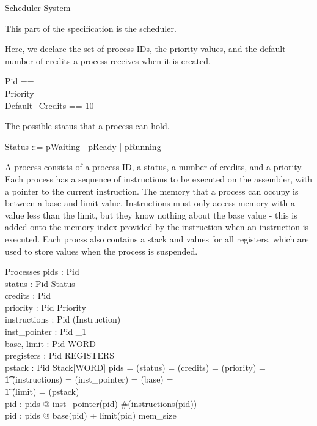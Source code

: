 \documentclass{article}
\begin{document}
\begin{zsection}
  \SECTION Scheduler \parents System
\end{zsection}

This part of the specification is the scheduler.

Here, we declare the set of process IDs, the priority values, and the
default number of credits a process receives when it is created.

\begin{zed}
  Pid == \nat\\
  Priority ==  \\
  Default\_Credits == 10 
\end{zed}

The possible status that a process can hold.

\begin{zed}
  Status ::= pWaiting | pReady | pRunning
\end{zed}

A process consists of a process ID, a status, a number of credits, and
a priority. Each process has a sequence of instructions to be executed
on the assembler, with a pointer to the current instruction. The
memory that a process can occupy is between a base and limit
value. Instructions must only access memory with a value less than the
limit, but they know nothing about the base value - this is added onto
the memory index provided by the instruction when an instruction is
executed. Each procss also contains a stack and values for all
registers, which are used to store values when the process is
suspended.

\begin{schema}{Processes}
  pids : \power Pid\\
  status : Pid \pfun Status\\
  credits : Pid \pfun \nat\\
  priority : Pid \pfun Priority\\
  instructions : Pid \pfun (\seq Instruction)\\
  inst\_pointer : Pid \pfun \nat_1\\    
  base, limit : Pid \pfun WORD\\
  pregisters : Pid \pfun REGISTERS\\
  pstack : Pid \pfun Stack[WORD]
\where
  pids = \dom(status) = \dom(credits) = \dom(priority) =\\
    \t1 \dom(instructions) = \dom(inst\_pointer) = \dom(base) =\\
    \t1 \dom(limit) = \dom(pstack)\\
  \forall pid : pids @ inst\_pointer(pid) \leq \#(instructions(pid))\\
  \forall pid : pids @ base(pid) + limit(pid) \leq mem\_size
\end{schema}
\end{document}
